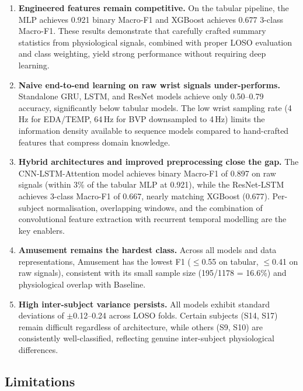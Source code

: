 \documentclass[11pt]{article}
\begin{document}
\begin{enumerate}
    \item \textbf{Engineered features remain competitive.}
    On the tabular pipeline, the MLP achieves 0.921 binary Macro-F1 and XGBoost achieves 0.677 3-class Macro-F1.
    These results demonstrate that carefully crafted summary statistics from physiological signals, combined with proper LOSO evaluation and class weighting, yield strong performance without requiring deep learning.

    \item \textbf{Naive end-to-end learning on raw wrist signals under-performs.}
    Standalone GRU, LSTM, and ResNet models achieve only 0.50--0.79 accuracy, significantly below tabular models.
    The low wrist sampling rate (4\,Hz for EDA/TEMP, 64\,Hz for BVP downsampled to 4\,Hz) limits the information density available to sequence models compared to hand-crafted features that compress domain knowledge.

    \item \textbf{Hybrid architectures and improved preprocessing close the gap.}
    The CNN-LSTM-Attention model achieves binary Macro-F1 of 0.897 on raw signals (within 3\% of the tabular MLP at 0.921), while the ResNet-LSTM achieves 3-class Macro-F1 of 0.667, nearly matching XGBoost (0.677).
    Per-subject normalisation, overlapping windows, and the combination of convolutional feature extraction with recurrent temporal modelling are the key enablers.

    \item \textbf{Amusement remains the hardest class.}
    Across all models and data representations, Amusement has the lowest F1 ($\leq$0.55 on tabular, $\leq$0.41 on raw signals), consistent with its small sample size (195/1178 = 16.6\%) and physiological overlap with Baseline.

    \item \textbf{High inter-subject variance persists.}
    All models exhibit standard deviations of $\pm$0.12--0.24 across LOSO folds.
    Certain subjects (S14, S17) remain difficult regardless of architecture, while others (S9, S10) are consistently well-classified, reflecting genuine inter-subject physiological differences.
\end{enumerate}

\subsection{Limitations}
\end{document}
